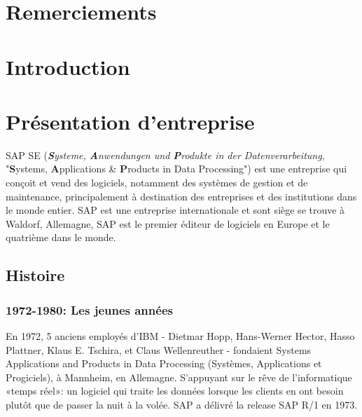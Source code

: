 \documentclass[12pt]{article}
\begin{document}
\setcounter{tocdepth}{2} %
\tableofcontents
\pagebreak

\newpage
\section{Remerciements}

\newpage
\section{Introduction}


\newpage
\section{Présentation d'entreprise}
SAP SE (\textit{\textbf{S}ysteme, \textbf{A}nwendungen und \textbf{P}rodukte in der Datenverarbeitung}, "\textbf{S}ystems, \textbf{A}pplications \& \textbf{P}roducts in Data Processing") est une entreprise qui conçoit et vend des logiciels, notamment des systèmes de gestion et de maintenance, principalement à destination des entreprises et des institutions dans le monde entier. SAP est une entreprise internationale et sont siège se trouve à Waldorf, Allemagne, SAP est le premier éditeur de logiciels en Europe et le quatrième dans le monde.

\subsection{Histoire}
    \subsubsection{1972-1980: Les jeunes années}
    En 1972, 5 anciens employés d'IBM - Dietmar Hopp, Hans-Werner Hector, Hasso Plattner, Klaus E. Tschira, et Claus Wellenreuther - fondaient Systems Applications and Products in Data Processing (Systèmes, Applications et Progiciels), à Mannheim, en Allemagne. S'appuyant sur le rêve de l'informatique «temps réel»: un logiciel qui traite les données lorsque les clients en ont besoin plutôt que de passer la nuit à la volée. SAP a délivré la release SAP R/1 en 1973.
\end{document}
